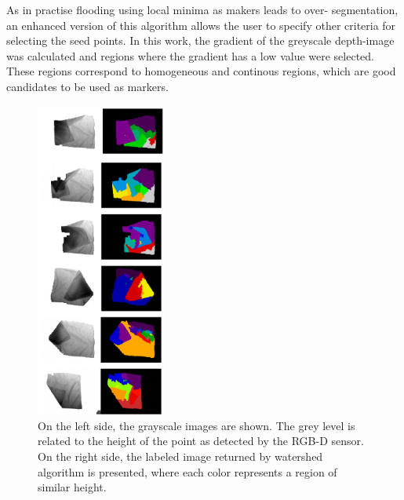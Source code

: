 
As in practise flooding using local minima as makers leads to over- segmentation, an enhanced version of this algorithm allows the user to specify other criteria for selecting the seed points. In this work, the gradient of the greyscale depth-image was calculated and regions where the gradient has a low value were selected. These regions correspond to homogeneous and continous regions, which are good candidates to be used as markers.

\begin{figure}[thpb]
    \centering
    \includegraphics[width=0.38\textwidth]{figures/colour_garment.pdf}
    \caption{On the left side, the grayscale images are shown. The grey level is related to the height of the point as detected by the RGB-D sensor. On the right side, the labeled image returned by watershed algorithm is presented, where each color represents a region of similar height.}
    \label{colour_garment}
\end{figure}